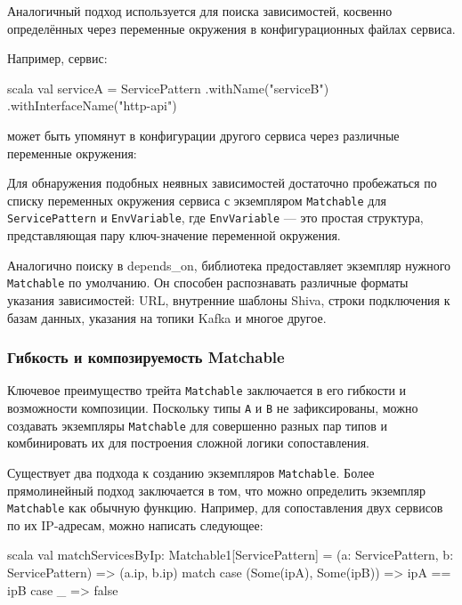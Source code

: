 Аналогичный подход используется для поиска зависимостей, косвенно определённых через переменные окружения в конфигурационных файлах сервиса.

Например, сервис:

\begin{codenl}{scala}
val serviceA = ServicePattern
  .withName("serviceB")
  .withInterfaceName("http-api")
\end{codenl}

может быть упомянут в конфигурации другого сервиса через различные переменные окружения: 


Для обнаружения подобных неявных зависимостей достаточно пробежаться по списку переменных окружения сервиса с экземпляром \verb|Matchable| для \verb|ServicePattern| и \verb|EnvVariable|, где \verb|EnvVariable| — это простая структура, представляющая пару ключ-значение переменной окружения.

Аналогично поиску в depends\_on, библиотека предоставляет экземпляр нужного \verb|Matchable| по умолчанию. Он способен распознавать различные форматы указания зависимостей: URL, внутренние шаблоны Shiva, строки подключения к базам данных, указания на топики Kafka и многое другое.

\subsubsection{Гибкость и композируемость Matchable}

Ключевое преимущество трейта \verb|Matchable| заключается в его гибкости и возможности композиции. Поскольку типы \verb|A| и \verb|B| не зафиксированы, можно создавать экземпляры \verb|Matchable| для совершенно разных пар типов и комбинировать их для построения сложной логики сопоставления.

Существует два подхода к созданию экземпляров \verb|Matchable|. Более прямолинейный подход заключается в том, что можно определить экземпляр \verb|Matchable| как обычную функцию. Например, для сопоставления двух сервисов по их IP-адресам, можно написать следующее:

\begin{code}{scala}
val matchServicesByIp: Matchable1[ServicePattern] =
  (a: ServicePattern, b: ServicePattern) =>
    (a.ip, b.ip) match {
      case (Some(ipA), Some(ipB)) => ipA == ipB
      case _ => false
    }
\end{code}

